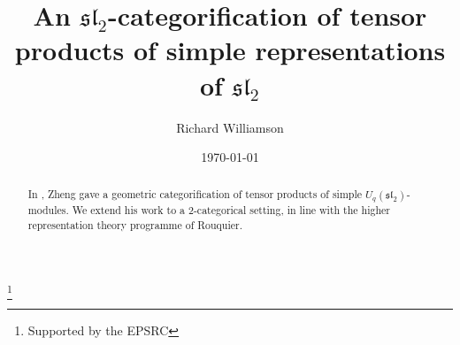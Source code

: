 \documentclass[12pt]{amsart}
\theoremstyle{definition}
\theoremstyle{remark}
\theoremstyle{remark}
\begin{document}
\pagestyle{headings}

\title{An $\mathfrak{sl}_{2}$-categorification of tensor products of simple representations of $\mathfrak{sl}_{2}$} 
\author{Richard Williamson}
\address{University of Oxford}
\date{\today}
\thanks{Supported by the EPSRC}

\begin{abstract} In \cite{ZhengGeometricCategorificationTensorProducts}, Zheng gave a geometric categorification of tensor products of simple $U_{q}(\mathfrak{sl}_{2})$-modules. We extend his work to a 2-categorical setting, in line with the higher representation theory programme of Rouquier.
\end{abstract}
\maketitle
\end{document}
